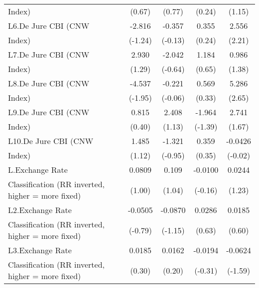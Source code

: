 {\begin{tabular}{l*{4}{c}}
Index)              &      (0.67)         &      (0.77)         &      (0.24)         &      (1.15)         \\
[1em]
L6.De Jure CBI (CNW &      -2.816         &      -0.357         &       0.355         &       2.556\sym{*}  \\
Index)              &     (-1.24)         &     (-0.13)         &      (0.24)         &      (2.21)         \\
[1em]
L7.De Jure CBI (CNW &       2.930         &      -2.042         &       1.184         &       0.986         \\
Index)              &      (1.29)         &     (-0.64)         &      (0.65)         &      (1.38)         \\
[1em]
L8.De Jure CBI (CNW &      -4.537         &      -0.221         &       0.569         &       5.286\sym{**} \\
Index)              &     (-1.95)         &     (-0.06)         &      (0.33)         &      (2.65)         \\
[1em]
L9.De Jure CBI (CNW &       0.815         &       2.408         &      -1.964         &       2.741         \\
Index)              &      (0.40)         &      (1.13)         &     (-1.39)         &      (1.67)         \\
[1em]
L10.De Jure CBI (CNW&       1.485         &      -1.321         &       0.359         &     -0.0426         \\
Index)              &      (1.12)         &     (-0.95)         &      (0.35)         &     (-0.02)         \\
[1em]
L.Exchange Rate     &      0.0809         &       0.109         &     -0.0100         &      0.0244         \\
Classification (RR inverted, higher = more fixed)&      (1.00)         &      (1.04)         &     (-0.16)         &      (1.23)         \\
[1em]
L2.Exchange Rate    &     -0.0505         &     -0.0870         &      0.0286         &      0.0185         \\
Classification (RR inverted, higher = more fixed)&     (-0.79)         &     (-1.15)         &      (0.63)         &      (0.60)         \\
[1em]
L3.Exchange Rate    &      0.0185         &      0.0162         &     -0.0194         &     -0.0624         \\
Classification (RR inverted, higher = more fixed)&      (0.30)         &      (0.20)         &     (-0.31)         &     (-1.59)         \\

\end{tabular}}

